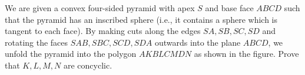 We are given a convex four-sided pyramid with apex $S$ and base face $ABCD$ such that the pyramid has an inscribed sphere (i.e., it contains a sphere which is tangent to each face). By making cuts along the edges $SA,SB,SC,SD$ and rotating the faces $SAB,SBC,SCD,SDA$ outwards into the plane $ABCD$,  we unfold the pyramid into the polygon $AKBLCMDN$ as shown in the figure. Prove that $K,L,M,N$ are concyclic.

\begin{center}
\def\svgwidth{0.5\textwidth}

\end{center}
